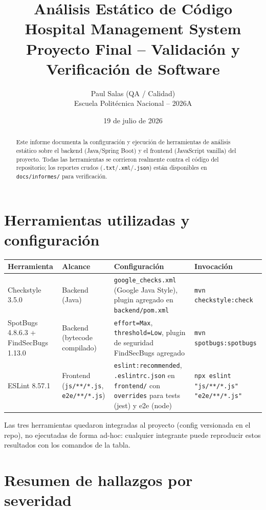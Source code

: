 \documentclass[11pt,a4paper]{article}
\title{
  \Large \textbf{An\'alisis Est\'atico de C\'odigo} \\
  \large Hospital Management System \\
  \large Proyecto Final -- Validaci\'on y Verificaci\'on de Software
}
\author{
  Paul Salas (QA / Calidad) \\
  \small Escuela Polit\'ecnica Nacional -- 2026A
}
\date{19 de julio de 2026}
\begin{document}
\maketitle
\thispagestyle{fancy}

\begin{abstract}
Este informe documenta la configuraci\'on y ejecuci\'on de herramientas de
an\'alisis est\'atico sobre el backend (Java/Spring Boot) y el frontend
(JavaScript vanilla) del proyecto. Todas las herramientas se corrieron
realmente contra el c\'odigo del repositorio; los reportes crudos
(\texttt{.txt}/\texttt{.xml}/\texttt{.json}) est\'an disponibles en
\texttt{docs/informes/} para verificaci\'on.
\end{abstract}

\tableofcontents

\section{Herramientas utilizadas y configuraci\'on}

\begin{longtable}{@{}p{2.6cm}p{3cm}p{5.5cm}p{2.5cm}@{}}
\toprule
\textbf{Herramienta} & \textbf{Alcance} & \textbf{Configuraci\'on} & \textbf{Invocaci\'on} \\
\midrule
\endhead
Checkstyle 3.5.0 & Backend (Java) & \texttt{google\_checks.xml} (Google Java
  Style), plugin agregado en \texttt{backend/pom.xml} &
  \texttt{mvn checkstyle:check} \\
SpotBugs 4.8.6.3 + FindSecBugs 1.13.0 & Backend (bytecode compilado) &
  \texttt{effort=Max}, \texttt{threshold=Low}, plugin de seguridad
  FindSecBugs agregado &
  \texttt{mvn spotbugs:spotbugs} \\
ESLint 8.57.1 & Frontend (\texttt{js/**/*.js}, \texttt{e2e/**/*.js}) &
  \texttt{eslint:recommended}, \texttt{.eslintrc.json} en
  \texttt{frontend/} con \texttt{overrides} para tests (jest) y e2e (node) &
  \texttt{npx eslint "js/**/*.js" "e2e/**/*.js"} \\
\bottomrule
\end{longtable}

Las tres herramientas quedaron integradas al proyecto (config versionada en
el repo), no ejecutadas de forma ad-hoc: cualquier integrante puede
reproducir estos resultados con los comandos de la tabla.

\section{Resumen de hallazgos por severidad}
\end{document}
